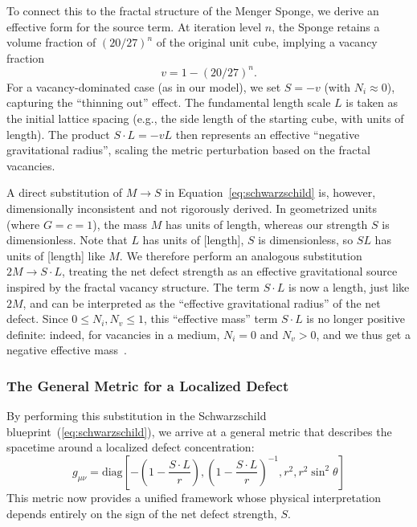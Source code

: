 \documentclass[%
  reprint,
  superscriptaddress,
  showpacs,
  showkeys,
  amsmath,amssymb,
  pra,
  longbibliography,
  floatfix,
]{revtex4-2}
\begin{document}
To connect this to the fractal structure of the Menger Sponge, we derive an effective form for the source term. At iteration level $n$, the Sponge retains a volume fraction of $(20/27)^n$ of the original unit cube, implying a vacancy fraction
\begin{equation}
v = 1 - (20/27)^n.
\end{equation}
For a vacancy-dominated case (as in our model), we set $S = -v$ (with $N_i \approx 0$), capturing the ``thinning out'' effect. The fundamental length scale $L$ is taken as the initial lattice spacing (e.g., the side length of the starting cube, with units of length). The product $S \cdot L = -v L$ then represents an effective ``negative gravitational radius'', scaling the metric perturbation based on the fractal vacancies.

A direct substitution of $M \to S$ in Equation~\ref{eq:schwarzschild} is, however, dimensionally inconsistent and not rigorously derived. In geometrized units (where $G=c=1$), the mass $M$ has units of length, whereas our strength $S$ is dimensionless. Note that $L$ has units of [length], $S$ is dimensionless, so $S L$ has units of [length] like $M$. We therefore perform an analogous substitution $2M \longrightarrow S \cdot L$, treating the net defect strength as an effective gravitational source inspired by the fractal vacancy structure. The term $S \cdot L$ is now a length, just like $2M$, and can be interpreted as the ``effective gravitational radius'' of the net defect. Since $0 \le N_i, N_v \le 1$, this ``effective mass'' term $S \cdot L$ is no longer positive definite: indeed, for vacancies in a medium, $N_i=0$ and $N_v > 0$, and we thus get a negative effective mass~\cite{bondi-1957}.

\subsubsection{The General Metric for a Localized Defect}
\label{2025-menger-gmld}
By performing this substitution in the Schwarzschild blueprint~(\ref{eq:schwarzschild}), we arrive at a general metric that describes the spacetime around a localized defect concentration:
\begin{equation}
g_{\mu\nu} = \text{diag}\left[-\left(1 - \frac{S \cdot L}{r}\right), \left(1 - \frac{S \cdot L}{r}\right)^{-1}, r^2, r^2 \sin^2 \theta\right]
\label{eq:defect_metric}
\end{equation}
This metric now provides a unified framework whose physical interpretation depends entirely on the sign of the net defect strength, $S$.
\end{document}
